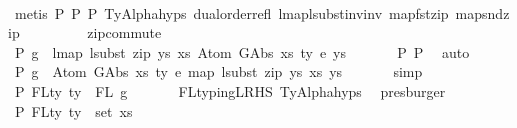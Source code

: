 \begin{isabellebody}
\ \ \ \ \ \isamarkupfalse%
\ {\isacharparenleft}{\kern0pt}metis\ P{}\ P{}\ P{}\ TyAlpha{\isachardot}{\kern0pt}hyps{\isacharparenleft}{\kern0pt}{}{\isacharparenright}{\kern0pt}\ dual{\isacharunderscore}{\kern0pt}order{\isachardot}{\kern0pt}refl\ lmap{\isacharunderscore}{\kern0pt}lsubst{\isacharunderscore}{\kern0pt}inv{\isacharunderscore}{\kern0pt}inv\ map{\isacharunderscore}{\kern0pt}fst{\isacharunderscore}{\kern0pt}zip\ map{\isacharunderscore}{\kern0pt}snd{\isacharunderscore}{\kern0pt}zip\isanewline
\ \ \ \ \ \ \ \ \ zip{\isacharunderscore}{\kern0pt}commute{\isacharparenright}{\kern0pt}\isanewline
\ \ \isamarkupfalse%
\ P{}{\isacharcolon}{\kern0pt}\ {\isachardoublequoteopen}g\ {\isasymsimeq}\ lmap\ {\isacharparenleft}{\kern0pt}lsubst\ {\isacharparenleft}{\kern0pt}zip\ ys{\isacharprime}{\kern0pt}\ xs{\isacharprime}{\kern0pt}{\isacharparenright}{\kern0pt}{\isacharparenright}{\kern0pt}\ {\isacharparenleft}{\kern0pt}Atom\ {\isacharparenleft}{\kern0pt}GAbs\ xs\ ty{}\ e{\isacharparenright}{\kern0pt}\ ys{\isacharparenright}{\kern0pt}{\isachardoublequoteclose}\isanewline
\ \ \ \ \ \isamarkupfalse%
\ P{}\ P{}\ \isamarkupfalse%
\ auto\isanewline
\ \ \isamarkupfalse%
\ \isamarkupfalse%
\ P{}{\isacharcolon}{\kern0pt}\ {\isachardoublequoteopen}g\ {\isasymsimeq}\ Atom\ {\isacharparenleft}{\kern0pt}GAbs\ xs\ ty{}\ e{\isacharparenright}{\kern0pt}\ {\isacharparenleft}{\kern0pt}map\ {\isacharparenleft}{\kern0pt}lsubst\ {\isacharparenleft}{\kern0pt}zip\ ys{\isacharprime}{\kern0pt}\ xs{\isacharprime}{\kern0pt}{\isacharparenright}{\kern0pt}{\isacharparenright}{\kern0pt}\ ys{\isacharparenright}{\kern0pt}{\isachardoublequoteclose}\isanewline
\ \ \ \ \ \isamarkupfalse%
\ simp\isanewline
\isanewline
\isanewline
\ \ \isamarkupfalse%
\ P{}{}{\isacharcolon}{\kern0pt}\ {\isachardoublequoteopen}FLty\ ty{\isacharprime}{\kern0pt}\ {\isacharequal}{\kern0pt}\ FL\ g{\isachardoublequoteclose}\isanewline
\ \ \ \ \ \isamarkupfalse%
\ FL{\isacharunderscore}{\kern0pt}typing{\isacharunderscore}{\kern0pt}LRHS\ TyAlpha{\isachardot}{\kern0pt}hyps{\isacharparenleft}{\kern0pt}{}{\isacharparenright}{\kern0pt}\ \isamarkupfalse%
\ presburger\isanewline
\ \ \isamarkupfalse%
\ \isamarkupfalse%
\ P{}{}{\isacharcolon}{\kern0pt}\ {\isachardoublequoteopen}FLty\ ty{\isacharprime}{\kern0pt}\ {\isacharequal}{\kern0pt}\ set\ xs{\isacharprime}{\kern0pt}{\isachardoublequoteclose}\isanewline

\end{isabellebody}
